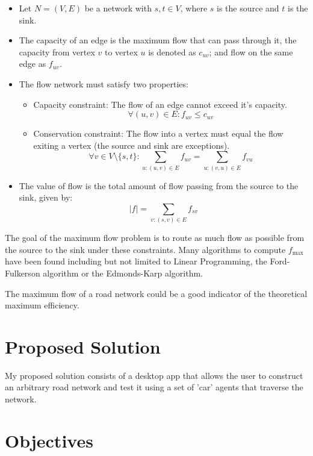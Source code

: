        \begin{itemize}
            \item Let $N = (V,E)$ be a network with $s, t \in V$, where $s$ is the source and $t$ is the sink.
            \item The capacity of an edge is the maximum flow that can pass through it, the capacity from vertex $v$ to vertex $u$ is denoted as $c_{uv}$; and flow on the same edge as $f_{uv}$.
            \item The flow network must satisfy two properties:
            \begin{itemize}
                \item Capacity constraint: The flow of an edge cannot exceed it's capacity. \[\forall (u, v) \in E : f_{uv} \leq c_{uv}\]
                \item Conservation constraint: The flow into a vertex must equal the flow exiting a vertex (the source and sink are exceptions).
                \[\forall v \in V \setminus \{s, t\} : \sum_{u : (u, v) \in E} f_{uv} = \sum_{u : (v, u) \in E} f_{vu}\]
            \end{itemize}
            \item The value of flow is the total amount of flow passing from the source to the sink, given by:
            \[|f| = \sum_{v : (s, v) \in E} f_{sv}\]
        \end{itemize}

        The goal of the maximum flow problem is to route as much flow as possible from the source to the sink under these constraints. Many algorithms to compute $f_\text{max}$ have been found including but not limited to Linear Programming, the Ford-Fulkerson algorithm or the Edmonds-Karp algorithm.

        The maximum flow of a road network could be a good indicator of the theoretical maximum efficiency.

\section{Proposed Solution}

    My proposed solution consists of a desktop app that allows the user to construct an arbitrary road network and test it using a set of 'car' agents that traverse the network.

\section{Objectives}
